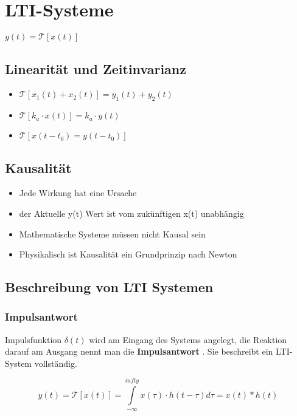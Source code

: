 \section{LTI-Systeme}

$ y(t) = \mathcal{T}[x(t)]$

\begin{multicols}{2}
    \subsection*{Linearität und Zeitinvarianz}
    \begin{itemize}
        \item $\mathcal{T}[x_1(t) + x_2(t)] = y_1(t) + y_2(t)$
        \item $\mathcal{T}[k_a \cdot x(t)] = k_a \cdot y(t)$
        \item $\mathcal{T}[x(t-t_0) = y(t-t_0)]$
    \end{itemize}

    \subsection*{Kausalität}
    \begin{itemize}
        \item Jede Wirkung hat eine Ursache
        \item der Aktuelle y(t) Wert ist vom zukünftigen x(t) unabhängig
        \item Mathematische Systeme müssen nicht Kausal sein
        \item Physikalisch ist Kausalität ein Grundprinzip nach Newton
    \end{itemize}

    \subsection{Beschreibung von LTI Systemen}

    \subsubsection{Impulsantwort}
    Impulsfunktion $\delta(t)$ wird am Eingang des Systems angelegt,
    die Reaktion darauf am Ausgang nennt man die \textbf{Impulsantwort} .
    Sie beschreibt ein LTI-System vollständig.

    $$ y(t) = \mathcal{T}[x(t)]
        = \int \limits _{-\infty} ^{infty} x(\tau) \cdot h(t-\tau)d\tau
        = x(t) * h(t)$$

\end{multicols}
